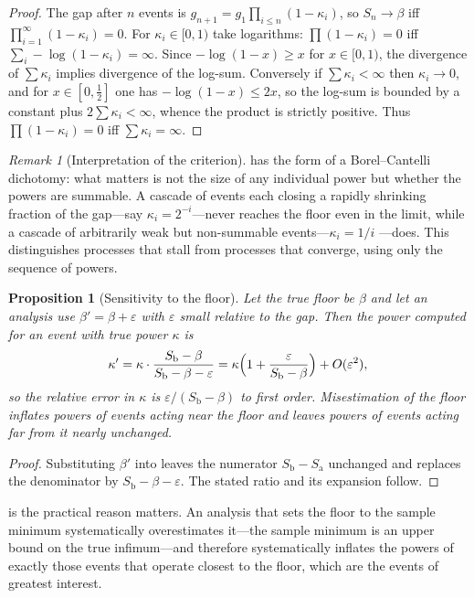 \documentclass[11pt,a4paper]{article}
\theoremstyle{thmstyle}
\newtheorem{proposition}[theorem]{Proposition}
\theoremstyle{definition}
\theoremstyle{remark}
\newtheorem{remark}[theorem]{Remark}
\newcommand{\flo}{\beta}
\newcommand{\kap}{\kappa}
\newcommand{\eps}{\varepsilon}
\begin{document}
\begin{proof}
The gap after $n$ events is $g_{n+1}=g_1\prod_{i\le n}(1-\kap_i)$, so
$S_n\to\flo$ iff $\prod_{i=1}^{\infty}(1-\kap_i)=0$. For $\kap_i\in[0,1)$
take logarithms: $\prod(1-\kap_i)=0$ iff
$\sum_i-\log(1-\kap_i)=\infty$. Since $-\log(1-x)\ge x$ for $x\in[0,1)$, the
divergence of $\sum\kap_i$ implies divergence of the log-sum. Conversely if
$\sum\kap_i<\infty$ then $\kap_i\to0$, and for $x\in[0,\tfrac12]$ one has
$-\log(1-x)\le2x$, so the log-sum is bounded by a constant plus
$2\sum\kap_i<\infty$, whence the product is strictly positive. Thus
$\prod(1-\kap_i)=0$ iff $\sum\kap_i=\infty$.
\end{proof}

\begin{remark}[Interpretation of the criterion]
\label{rem:borel}
 has the form of a Borel--Cantelli dichotomy: what
matters is not the size of any individual power but whether the powers are
summable. A cascade of events each closing a rapidly shrinking fraction of
the gap---say $\kap_i=2^{-i}$---never reaches the floor even in the limit,
while a cascade of arbitrarily weak but non-summable events---$\kap_i=1/i$
---does. This distinguishes processes that stall from processes that
converge, using only the sequence of powers.
\end{remark}

\begin{proposition}[Sensitivity to the floor]
\label{prop:floor-sensitivity}
Let the true floor be $\flo$ and let an analysis use $\flo'=\flo+\eps$ with
$\eps$ small relative to the gap. Then the power computed for an event with
true power $\kap$ is
\[
\kap'=\kap\cdot\frac{S_{\mathrm{b}}-\flo}{S_{\mathrm{b}}-\flo-\eps}
=\kap\Bigl(1+\frac{\eps}{S_{\mathrm{b}}-\flo}\Bigr)+O(\eps^2),
\]
so the relative error in $\kap$ is $\eps/(S_{\mathrm{b}}-\flo)$ to first
order. Misestimation of the floor inflates powers of events acting near the
floor and leaves powers of events acting far from it nearly unchanged.
\end{proposition}

\begin{proof}
Substituting $\flo'$ into  leaves the numerator
$S_{\mathrm{b}}-S_{\mathrm{a}}$ unchanged and replaces the denominator by
$S_{\mathrm{b}}-\flo-\eps$. The stated ratio and its expansion follow.
\end{proof}

 is the practical reason
 matters. An analysis that sets the floor to the
sample minimum systematically overestimates it---the sample minimum is an
upper bound on the true infimum---and therefore systematically inflates the
powers of exactly those events that operate closest to the floor, which are
the events of greatest interest.
\end{document}

